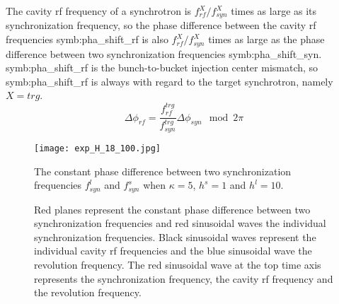 The cavity rf frequency of a synchrotron is $f_{\mathit{rf}}^{X}/f_{\mathit{syn}}^{X}$ times as large as its synchronization frequency, so the phase difference between the cavity rf frequencies \gls{symb:pha_shift_rf} is also $f_{\mathit{rf}}^{X}/f_{\mathit{syn}}^{X}$ times as large as the phase difference between two synchronization frequencies \gls{symb:pha_shift_syn}. \gls{symb:pha_shift_rf} is the bunch-to-bucket injection center mismatch, so \gls{symb:pha_shift_rf} is always with regard to the target synchrotron, namely $X=trg$.
\begin{equation}
\Delta \phi_\mathit{rf}=\frac{f_{\mathit{rf}}^{trg}}{f_{\mathit{syn}}^{trg}}\Delta \phi_\mathit{syn} \mod 2\pi \label{phase_diff_rf}
\end{equation}
\begin{figure}[!htb]
   \centering   
   \texttt{[image: exp\_H\_18\_100.jpg]}
	\caption{The constant phase difference between two synchronization frequencies $f_{\mathit{syn}}^{l}$ and $f_{\mathit{syn}}^{s}$ when $\kappa=5$, $h^s=1$ and $h^l=10$. }

	\caption*{Red planes represent the constant phase difference between two synchronization frequencies and red sinusoidal waves the individual synchronization frequencies. Black sinusoidal waves represent the individual cavity rf frequencies and the blue sinusoidal wave the revolution frequency. The red sinusoidal wave at the top time axis represents the synchronization frequency, the cavity rf frequency and the revolution frequency.}
   \label{exp_H_18_100}
\end{figure} 

